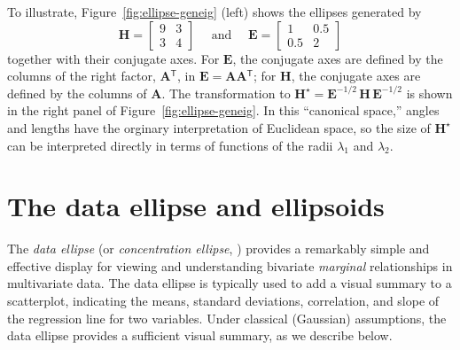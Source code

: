 \documentclass[11pt]{article}%
\newcommand*{\figref}[1]{Figure~\ref{#1}}
\newcommand{\trans}{\ensuremath{^\mathsf{T}}}
\newcommand*{\mat}[1]{\ensuremath{\bm{#1}}}
\newcommand*{\invhalf}[1]{\ensuremath{\mat{#1}^{-1/2}}}
\begin{document}
To illustrate, \figref{fig:ellipse-geneig} (left) shows
the ellipses generated by
\begin{equation*}
 \mat{H} = \left[ \begin{array}{cc}
                   9 & 3 \\
                   3 & 4
                  \end{array}\right]
 \quad \mbox{ and } \quad
 \mat{E} = \left[ \begin{array}{cc}
                   1 & 0.5 \\
                   0.5 & 2
                  \end{array}\right]
\end{equation*}
together with their conjugate axes. For \mat{E}, the conjugate axes are defined by the columns of the right factor,
$\mat{A}\trans$,
in $\mat{E} = \mat{A} \mat{A}\trans$; for \mat{H}, the conjugate axes are defined by the columns of $\mat{A}$.
The transformation to $\mat{H}^\star = \invhalf{E} \, \mat{H} \, \invhalf{E}$ is shown in the right panel
of \figref{fig:ellipse-geneig}. In this ``canonical space,'' angles and lengths have the orginary interpretation
of Euclidean space, so the size of $\mat{H}^\star$ can be interpreted directly in terms of functions of
the radii $\lambda_1$ and $\lambda_2$.


\section{The data ellipse and ellipsoids}\label{sec:data-ellipse}

The \emph{data ellipse} \citep{Monette:90} (or \emph{concentration ellipse}, \citealp[Ch. 7]{Dempster:69})
provides a remarkably
simple and effective display for viewing and understanding
bivariate \emph{marginal} relationships in multivariate data.
The data ellipse is typically used to add a visual summary to a scatterplot,
indicating the means, standard deviations, correlation,
and slope of the regression line for
two variables. Under classical (Gaussian) assumptions, the data ellipse
provides a sufficient visual summary, as we describe below.
\end{document}
